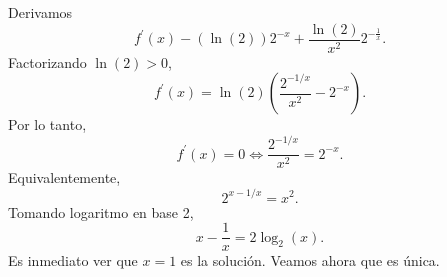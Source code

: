 \documentclass[12pt,a4paper]{article}
\newcommand{\paren}[1]{\left( #1 \right)}
\begin{document}
\begin{solucion}
        Derivamos
        \begin{equation*}
            f^{\prime}(x)-(\ln(2))2^{-x}+\frac{\ln(2)}{x^{2}}2^{-\frac{1}{x}}.
        \end{equation*}
        Factorizando $\ln(2)\gt0$,
        \begin{equation*}
            f^{\prime}(x)=\ln(2)\paren{\frac{2^{-1/x}}{x^{2}}-2^{-x}}.
        \end{equation*}
        Por lo tanto,
        \begin{equation*}
            f^{\prime}(x)=0\Longleftrightarrow\frac{2^{-1/x}}{x^{2}}=2^{-x}.
        \end{equation*}
        Equivalentemente,
        \begin{equation*}
            2^{x-1/x}=x^{2}.
        \end{equation*}
        Tomando logaritmo en base 2,
        \begin{equation*}
            x-\frac{1}{x}=2\log_{2}(x).
        \end{equation*}
        Es inmediato ver que $x=1$ es la solución. Veamos ahora que es única.


\end{solucion}
\end{document}
